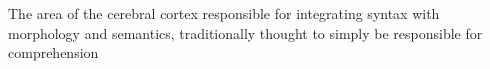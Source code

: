 The area of the cerebral cortex responsible for integrating syntax with morphology and semantics, traditionally thought to simply be responsible for comprehension
